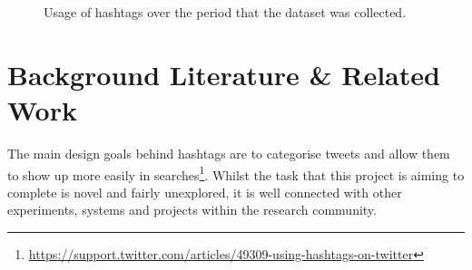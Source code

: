 \documentclass[11pt,a4paper]{report}
\begin{document}
\begin{figure}[htpb]
    \centering

    \caption{Usage of hashtags over the period that the dataset was collected.}
\end{figure}

\pagebreak

\chapter{Background Literature \& Related Work}
\label{sec:litreview}
The main design goals behind hashtags are to categorise tweets and allow them to show up more easily in searches\footnote{\url{https://support.twitter.com/articles/49309-using-hashtags-on-twitter}}. Whilst the task that this project is aiming to complete is novel and fairly unexplored, it is well connected with other experiments, systems and projects within the research community.
\end{document}
